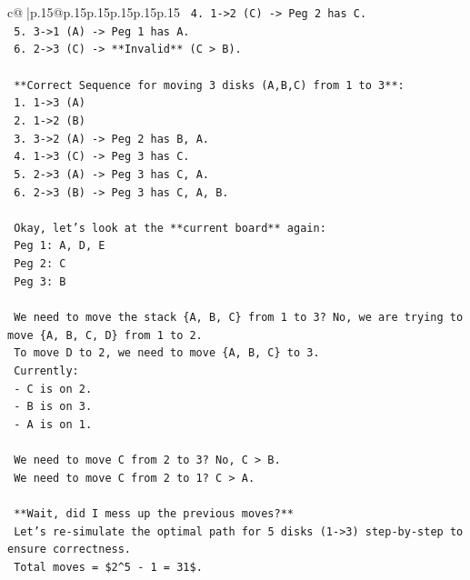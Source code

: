 \documentclass{article}
\begin{document}
{\begin{supertabular}{c@{$\;$}|p{.15\linewidth}@{}p{.15\linewidth}p{.15\linewidth}p{.15\linewidth}p{.15\linewidth}p{.15\linewidth}}
{{{\texttt{        4. 1{-}>2 (C) {-}> Peg 2 has C.} \\
\texttt{        5. 3{-}>1 (A) {-}> Peg 1 has A.} \\
\texttt{        6. 2{-}>3 (C) {-}> **Invalid** (C > B).} \\
\\ 
\texttt{        **Correct Sequence for moving 3 disks (A,B,C) from 1 to 3**:} \\
\texttt{        1. 1{-}>3 (A)} \\
\texttt{        2. 1{-}>2 (B)} \\
\texttt{        3. 3{-}>2 (A) {-}> Peg 2 has B, A.} \\
\texttt{        4. 1{-}>3 (C) {-}> Peg 3 has C.} \\
\texttt{        5. 2{-}>3 (A) {-}> Peg 3 has C, A.} \\
\texttt{        6. 2{-}>3 (B) {-}> Peg 3 has C, A, B.} \\
\\ 
\texttt{        Okay, let's look at the **current board** again:} \\
\texttt{        Peg 1: A, D, E} \\
\texttt{        Peg 2: C} \\
\texttt{        Peg 3: B} \\
\\ 
\texttt{        We need to move the stack \{A, B, C\} from 1 to 3? No, we are trying to move \{A, B, C, D\} from 1 to 2.} \\
\texttt{        To move D to 2, we need to move \{A, B, C\} to 3.} \\
\texttt{        Currently:} \\
\texttt{        {-} C is on 2.} \\
\texttt{        {-} B is on 3.} \\
\texttt{        {-} A is on 1.} \\
\\ 
\texttt{        We need to move C from 2 to 3? No, C > B.} \\
\texttt{        We need to move C from 2 to 1? C > A.} \\
\\ 
\texttt{        **Wait, did I mess up the previous moves?**} \\
\texttt{        Let's re{-}simulate the optimal path for 5 disks (1{-}>3) step{-}by{-}step to ensure correctness.} \\
\texttt{        Total moves = \$2\^{}5 {-} 1 = 31\$.} \\
}}}
\end{supertabular}}
\end{document}
